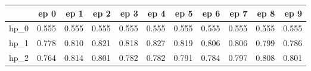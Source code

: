 \begin{tabular}{lrrrrrrrrrr}
\toprule
{} &   ep 0 &   ep 1 &   ep 2 &   ep 3 &   ep 4 &   ep 5 &   ep 6 &   ep 7 &   ep 8 &   ep 9 \\
\midrule
hp\_0 &  0.555 &  0.555 &  0.555 &  0.555 &  0.555 &  0.555 &  0.555 &  0.555 &  0.555 &  0.555 \\
hp\_1 &  0.778 &  0.810 &  0.821 &  0.818 &  0.827 &  0.819 &  0.806 &  0.806 &  0.799 &  0.786 \\
hp\_2 &  0.764 &  0.814 &  0.801 &  0.782 &  0.782 &  0.791 &  0.784 &  0.797 &  0.808 &  0.801 \\
\bottomrule
\end{tabular}
